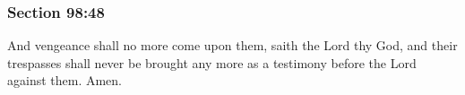 	\subsubsection{Section 98:48} %
		\label{DC98-48}

		And vengeance shall no more come upon them, saith the Lord thy God, and their trespasses shall never be brought any more as a testimony before the Lord against them.  Amen.

